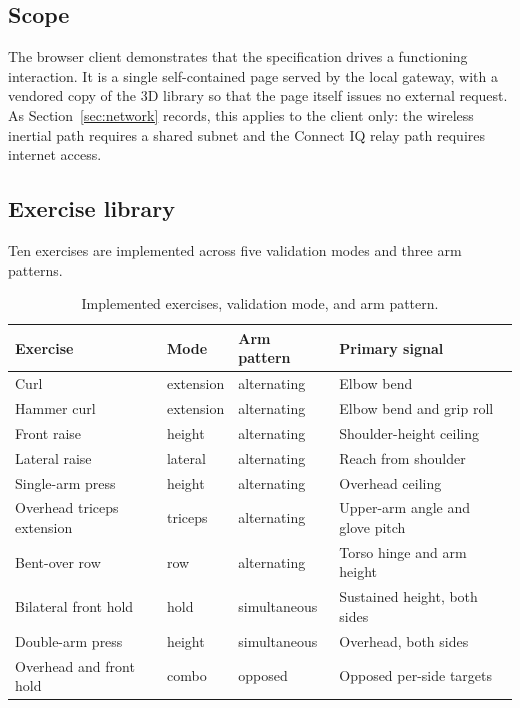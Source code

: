 \documentclass[11pt,a4paper]{article}
\begin{document}
\subsection{Scope}

The browser client demonstrates that the specification drives a functioning
interaction. It is a single self-contained page served by the local gateway, with
a vendored copy of the 3D library so that the page itself issues no external
request. As Section~\ref{sec:network} records, this applies to the client only:
the wireless inertial path requires a shared subnet and the Connect IQ relay path
requires internet access.

\subsection{Exercise library}

Ten exercises are implemented across five validation modes and three arm
patterns.

\begin{table}[H]
\centering
\small
\caption{Implemented exercises, validation mode, and arm pattern.}
\begin{tabularx}{\textwidth}{@{}L{5.4cm} L{2.6cm} L{2.8cm} Y@{}}
\toprule
\textbf{Exercise} & \textbf{Mode} & \textbf{Arm pattern} & \textbf{Primary signal} \\
\midrule
Curl & extension & alternating & Elbow bend \\
Hammer curl & extension & alternating & Elbow bend and grip roll \\
Front raise & height & alternating & Shoulder-height ceiling \\
Lateral raise & lateral & alternating & Reach from shoulder \\
Single-arm press & height & alternating & Overhead ceiling \\
Overhead triceps extension & triceps & alternating & Upper-arm angle and glove pitch \\
Bent-over row & row & alternating & Torso hinge and arm height \\
Bilateral front hold & hold & simultaneous & Sustained height, both sides \\
Double-arm press & height & simultaneous & Overhead, both sides \\
Overhead and front hold & combo & opposed & Opposed per-side targets \\
\bottomrule
\end{tabularx}
\end{table}
\end{document}
